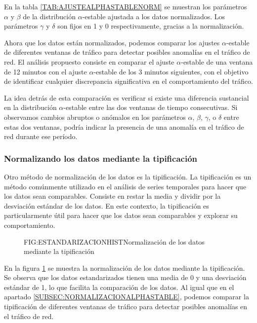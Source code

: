 En la tabla \ref{TAB:AJUSTEALPHASTABLENORM} se muestran los parámetros $\alpha$ y $\beta$ de la distribución $\alpha$-estable ajustada a los datos normalizados. Los parámetros $\gamma$ y $\delta$ son fijos en 1 y 0 respectivamente, gracias a la normalización.

Ahora que los datos están normalizados, podemos comparar los ajustes $\alpha$-estable de diferentes ventanas de tráfico para detectar posibles anomalías en el tráfico de red. El análisis propuesto consiste en comparar el ajuste $\alpha$-estable de una ventana de 12 minutos con el ajuste $\alpha$-estable de los 3 minutos siguientes, con el objetivo de identificar cualquier discrepancia significativa en el comportamiento del tráfico.

La idea detrás de esta comparación es verificar si existe una diferencia sustancial en la distribución $\alpha$-estable entre las dos ventanas de tiempo consecutivas. Si observamos cambios abruptos o anómalos en los parámetros $\alpha$, $\beta$, $\gamma$, o $\delta$ entre estas dos ventanas, podría indicar la presencia de una anomalía en el tráfico de red durante ese período.

\subsubsection{Normalizando los datos mediante la tipificación}\label{SUBSEC:NORMALIZACIONTIPIFICACION}

Otro método de normalización de los datos es la tipificación. La tipificación es un método comúnmente utilizado en el análisis de series temporales para hacer que los datos sean comparables. Consiste en restar la media y dividir por la desviación estándar de los datos. En este contexto, la tipificación es particularmente útil para hacer que los datos sean comparables y explorar su comportamiento.

\begin{figure}[Normalización de los datos mediante la tipificación]{FIG:ESTANDARIZACIONHIST}{Normalización de los datos mediante la tipificación}
    \label{FIG:ESTANDARIZACIONHIST}
\end{figure}

En la figura \ref{FIG:ESTANDARIZACIONHIST} se muestra la normalización de los datos mediante la tipificación. Se observa que los datos estandarizados tienen una media de 0 y una desviación estándar de 1, lo que facilita la comparación de los datos. 
Al igual que en el apartado \ref{SUBSEC:NORMALIZACIONALPHASTABLE}, podemos comparar la tipificación de diferentes ventanas de tráfico para detectar posibles anomalías en el tráfico de red. 

